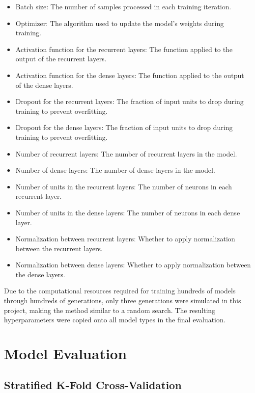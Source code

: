 \begin{itemize}
	\item Batch size: The number of samples processed in each training iteration.
	\item Optimizer: The algorithm used to update the model's weights during training.
	\item Activation function for the recurrent layers: The function applied to the output of the recurrent layers.
	\item Activation function for the dense layers: The function applied to the output of the dense layers.
	\item Dropout for the recurrent layers: The fraction of input units to drop during training to prevent overfitting.
	\item Dropout for the dense layers: The fraction of input units to drop during training to prevent overfitting.
	\item Number of recurrent layers: The number of recurrent layers in the model.
	\item Number of dense layers: The number of dense layers in the model.
	\item Number of units in the recurrent layers: The number of neurons in each recurrent layer.
	\item Number of units in the dense layers: The number of neurons in each dense layer.
	\item Normalization between recurrent layers: Whether to apply normalization between the recurrent layers.
	\item Normalization between dense layers: Whether to apply normalization between the dense layers.
\end{itemize}

Due to the computational resources required for training hundreds of models through hundreds of generations, only three generations were simulated in this project, making the method similar to a random search. The resulting hyperparameters were copied onto all model types in the final evaluation.

\section{Model Evaluation}

\subsection{Stratified K-Fold Cross-Validation}

